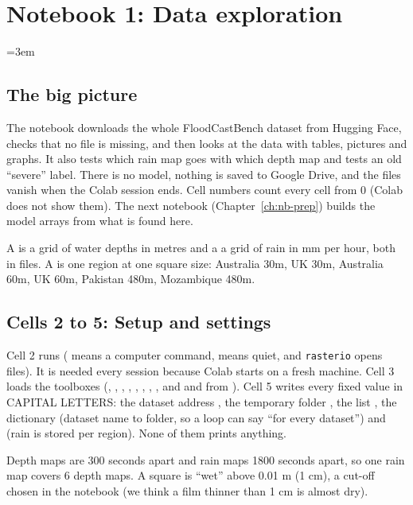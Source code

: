 \section{Notebook 1: Data exploration}\label{ch:nb-explore}
\begingroup\emergencystretch=3em

\subsection{The big picture}
The notebook downloads the whole FloodCastBench dataset from Hugging Face, checks that no file is missing, and then looks at the data with tables, pictures and graphs. It also tests which rain map goes with which depth map and tests an old ``severe'' label. There is no model, nothing is saved to Google Drive, and the files vanish when the Colab session ends. Cell numbers count every cell from 0 (Colab does not show them). The next notebook (Chapter~\ref{ch:nb-prep}) builds the model arrays from what is found here.

A  is a grid of water depths in metres and a  a grid of rain in mm per hour, both in  files. A  is one region at one square size: Australia 30m, UK 30m, Australia 60m, UK 60m, Pakistan 480m, Mozambique 480m.

\subsection{Cells 2 to 5: Setup and settings}
Cell 2 runs  (\cd{!} means a computer command,  means quiet, and \texttt{rasterio} opens  files). It is needed every session because Colab starts on a fresh machine. Cell 3 loads the toolboxes (, , , , , , , , and  and  from ). Cell 5 writes every fixed value in CAPITAL LETTERS: the dataset address , the temporary folder , the list , the dictionary  (dataset name to folder, so a loop can say ``for every dataset'') and  (rain is stored per region). None of them prints anything.

Depth maps are 300 seconds apart and rain maps 1800 seconds apart, so one rain map covers 6 depth maps. A square is ``wet'' above 0.01 m (1 cm), a cut-off chosen in the notebook (we think a film thinner than 1 cm is almost dry).

